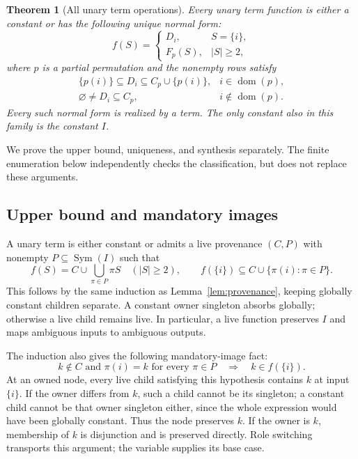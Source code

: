 \documentclass[11pt]{article}
\newtheorem{theorem}{Theorem}[section]
\begin{document}
\begin{theorem}[All unary term operations]\label{thm:unary}
Every unary term function is either a constant or has the following
unique normal form:
\begin{equation}\label{eq:unary}
 f(S)=\begin{cases}D_i,&S=\{i\},\\F_p(S),&|S|\geq2,\end{cases}
\end{equation}
where $p$ is a partial permutation and the nonempty rows satisfy
\[
 \begin{array}{ll}
 \{p(i)\}\subseteq D_i\subseteq C_p\cup\{p(i)\},
       &i\in\operatorname{dom}(p),\\
 \varnothing\ne D_i\subseteq C_p,
       &i\notin\operatorname{dom}(p).
 \end{array}
\]
Every such normal form is realized by a term. The only constant also
in this family is the constant $I$.
\end{theorem}

We prove the upper bound, uniqueness, and synthesis separately. The
finite enumeration below independently checks the classification, but
does not replace these arguments.

\subsection{Upper bound and mandatory images}

A unary term is either constant or admits a live provenance
$(C,P)$ with nonempty $P\subseteq\operatorname{Sym}(I)$ such that
\[
 f(S)=C\cup\bigcup_{\pi\in P}\pi S\quad(|S|\geq2),\qquad
 f(\{i\})\subseteq C\cup\{\pi(i):\pi\in P\}.
\]
This follows by the same induction as Lemma~\ref{lem:provenance}, keeping
globally constant children separate. A constant owner singleton absorbs
globally; otherwise a live child remains live. In particular, a live
function preserves $I$ and maps ambiguous inputs to ambiguous outputs.

The induction also gives the following mandatory-image fact:
\begin{equation}\label{eq:mandatory}
 k\notin C\text{ and }\pi(i)=k\text{ for every }\pi\in P
       \quad\Longrightarrow\quad k\in f(\{i\}).
\end{equation}
At an owned node, every live child satisfying this hypothesis contains
$k$ at input $\{i\}$. If the owner differs from $k$, such a child cannot
be its singleton; a constant child cannot be that owner singleton
either, since the whole expression would have been globally constant.
Thus the node preserves $k$. If the owner is $k$, membership of $k$ is
disjunction and is preserved directly. Role switching transports this
argument; the variable supplies its base case.
\end{document}
